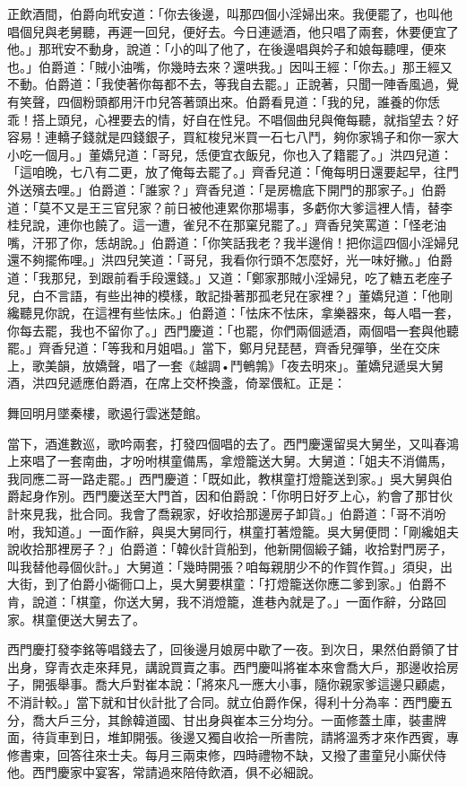 正飲酒間，伯爵向玳安道：「你去後邊，叫那四個小淫婦出來。我便罷了，也叫他唱個兒與老舅聽，再遲一回兒，便好去。今日連遞酒，他只唱了兩套，休要便宜了他。」那玳安不動身，說道：「小的叫了他了，在後邊唱與妗子和娘每聽哩，便來也。」伯爵道：「賊小油嘴，你幾時去來？還哄我。」因叫王經：「你去。」那王經又不動。伯爵道：「我使著你每都不去，等我自去罷。」正說著，只聞一陣香風過，覺有笑聲，四個粉頭都用汗巾兒答著頭出來。伯爵看見道：「我的兒，誰養的你恁乖！搭上頭兒，心裡要去的情，好自在性兒。不唱個曲兒與俺每聽，就指望去？好容易！連轎子錢就是四錢銀子，買紅梭兒米買一石七八鬥，夠你家鴇子和你一家大小吃一個月。」董嬌兒道：「哥兒，恁便宜衣飯兒，你也入了籍罷了。」洪四兒道：「這咱晚，七八有二更，放了俺每去罷了。」齊香兒道：「俺每明日還要起早，往門外送殯去哩。」伯爵道：「誰家？」齊香兒道：「是房檐底下開門的那家子。」伯爵道：「莫不又是王三官兒家？前日被他連累你那場事，多虧你大爹這裡人情，替李桂兒說，連你也饒了。這一遭，雀兒不在那窠兒罷了。」齊香兒笑罵道：「怪老油嘴，汗邪了你，恁胡說。」伯爵道：「你笑話我老？我半邊俏！把你這四個小淫婦兒還不夠擺佈哩。」洪四兒笑道：「哥兒，我看你行頭不怎麼好，光一味好撇。」伯爵道：「我那兒，到跟前看手段還錢。」又道：「鄭家那賊小淫婦兒，吃了糖五老座子兒，白不言語，有些出神的模樣，敢記掛著那孤老兒在家裡？」董嬌兒道：「他剛纔聽見你說，在這裡有些怯床。」伯爵道：「怯床不怯床，拿樂器來，每人唱一套，你每去罷，我也不留你了。」西門慶道：「也罷，你們兩個遞酒，兩個唱一套與他聽罷。」齊香兒道：「等我和月姐唱。」當下，鄭月兒琵琶，齊香兒彈箏，坐在交床上，歌美韻，放嬌聲，唱了一套《越調•鬥鵪鶉》「夜去明來」。董嬌兒遞吳大舅酒，洪四兒遞應伯爵酒，在席上交杯換盞，倚翠偎紅。正是：

舞回明月墜秦樓，歌遏行雲迷楚館。

當下，酒進數巡，歌吟兩套，打發四個唱的去了。西門慶還留吳大舅坐，又叫春鴻上來唱了一套南曲，才吩咐棋童備馬，拿燈籠送大舅。大舅道：「姐夫不消備馬，我同應二哥一路走罷。」西門慶道：「既如此，教棋童打燈籠送到家。」吳大舅與伯爵起身作別。西門慶送至大門首，因和伯爵說：「你明日好歹上心，約會了那甘伙計來見我，批合同。我會了喬親家，好收拾那邊房子卸貨。」伯爵道：「哥不消吩咐，我知道。」一面作辭，與吳大舅同行，棋童打著燈籠。吳大舅便問：「剛纔姐夫說收拾那裡房子？」伯爵道：「韓伙計貨船到，他新開個緞子鋪，收拾對門房子，叫我替他尋個伙計。」大舅道：「幾時開張？咱每親朋少不的作賀作賀。」須臾，出大街，到了伯爵小衚衕口上，吳大舅要棋童：「打燈籠送你應二爹到家。」伯爵不肯，說道：「棋童，你送大舅，我不消燈籠，進巷內就是了。」一面作辭，分路回家。棋童便送大舅去了。

西門慶打發李銘等唱錢去了，回後邊月娘房中歇了一夜。到次日，果然伯爵領了甘出身，穿青衣走來拜見，講說買賣之事。西門慶叫將崔本來會喬大戶，那邊收拾房子，開張舉事。喬大戶對崔本說：「將來凡一應大小事，隨你親家爹這邊只顧處，不消計較。」當下就和甘伙計批了合同。就立伯爵作保，得利十分為率：西門慶五分，喬大戶三分，其餘韓道國、甘出身與崔本三分均分。一面修蓋土庫，裝畫牌面，待貨車到日，堆卸開張。後邊又獨自收拾一所書院，請將溫秀才來作西賓，專修書柬，回答往來士夫。每月三兩束修，四時禮物不缺，又撥了畫童兒小廝伏侍他。西門慶家中宴客，常請過來陪侍飲酒，俱不必細說。

